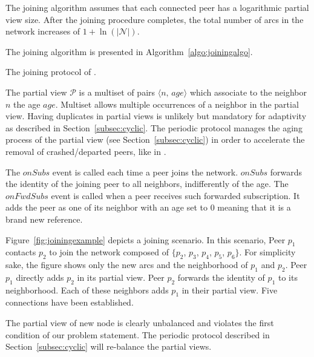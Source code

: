 The \SPRAY{} joining algorithm assumes that each connected peer has a
logarithmic partial view size. After the joining procedure completes,
the total number of arcs in the network increases of
$1+\ln(|\mathcal{N}|)$.


The \SPRAY{} joining algorithm is presented in
Algorithm~\ref{algo:joiningalgo}.

\begin{algorithm}

\caption{\label{algo:joiningalgo}The joining protocol of \SPRAY{}.}
\end{algorithm}

The partial view $\mathcal{P}$ is a multiset of pairs $\langle n,\, age\rangle$
which associate to the neighbor $n$ the age $age$. Multiset allows multiple
occurrences of a neighbor in the partial view. Having duplicates in partial
views is unlikely but mandatory for adaptivity as described in
Section~\ref{subsec:cyclic}. The periodic protocol manages the aging process of
the partial view (see Section~\ref{subsec:cyclic}) in order to accelerate the
removal of crashed/departed peers, like in \CYCLON{}.

The $onSubs$ event is called each time a peer joins the
network. $onSubs$ forwards the identity of the joining peer to all
neighbors, indifferently of the age. The $onFwdSubs$ event is called
when a peer receives such forwarded subscription. It adds the peer as
one of its neighbor with an age set to $0$ meaning that it is a brand
new reference.

Figure~\ref{fig:joiningexample} depicts a joining scenario. In this scenario,
Peer $p_1$ contacts $p_2$ to join the network composed of $\{p_2$, $p_3$,
$p_4$, $p_5$, $p_6\}$. For simplicity sake, the figure shows only the new arcs
and the neighborhood of $p_1$ and $p_2$. Peer $p_1$ directly adds $p_2$ in its
partial view. Peer $p_2$ forwards the identity of $p_1$ to its
neighborhood. Each of these neighbors adds $p_1$ in their partial view. Five
connections have been established.

The partial view of new node is clearly unbalanced and violates the
first condition of our problem statement. The periodic protocol
described in Section~\ref{subsec:cyclic} will re-balance the partial
views.


